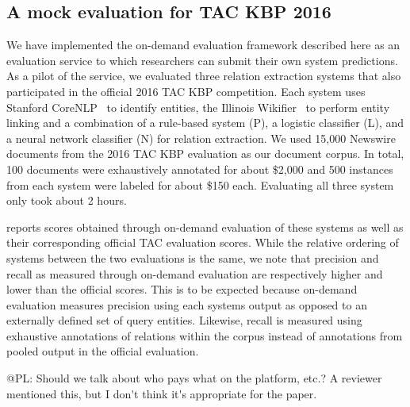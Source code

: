 \subsection{A mock evaluation for TAC KBP 2016}
We have implemented the on-demand evaluation framework described here as an evaluation service to which researchers can submit their own system predictions.
As a pilot of the service, we evaluated three relation extraction systems that also participated in the official 2016 TAC KBP competition.
Each system uses Stanford CoreNLP~\citep{manning2014stanford} to identify entities, the Illinois Wikifier~\citep{ratinov2011local} to perform entity linking and a combination of a rule-based system (P), a logistic classifier (L), and a neural network classifier (N) for relation extraction.
We used 15,000 Newswire documents from the 2016 TAC KBP evaluation as our document corpus.
In total, 100 documents were exhaustively annotated for about \$2,000 and 500 instances from each system were labeled for about \$150 each.
Evaluating all three system only took about 2 hours. 

 reports scores obtained through on-demand evaluation of these systems as well as their corresponding official TAC evaluation scores.
While the relative ordering of systems between the two evaluations is the same, we note that precision and recall as measured through on-demand evaluation are respectively higher and lower than the official scores.
This is to be expected because on-demand evaluation measures precision using each systems output as opposed to an externally defined set of query entities.
Likewise, recall is measured using exhaustive annotations of relations within the corpus instead of annotations from pooled output in the official evaluation.  


\ac{@PL: Should we talk about who pays what on the platform, etc.? A reviewer mentioned this, but I don't think it's appropriate for the paper.}
